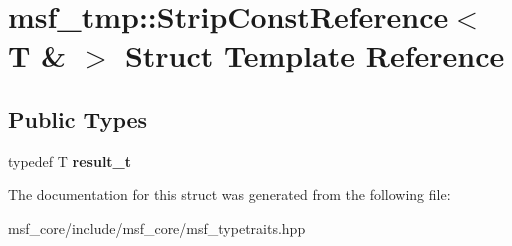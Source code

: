 \hypertarget{structmsf__tmp_1_1StripConstReference_3_01T_01_6_01_4}{\section{msf\-\_\-tmp\-:\-:Strip\-Const\-Reference$<$ T \& $>$ Struct Template Reference}
\label{structmsf__tmp_1_1StripConstReference_3_01T_01_6_01_4}
}
\subsection*{Public Types}
\begin{DoxyCompactItemize}
\item 
\hypertarget{structmsf__tmp_1_1StripConstReference_3_01T_01_6_01_4_ae467d3d062236fe36daa8c856cee2741}{typedef T {\bfseries result\-\_\-t}}\label{structmsf__tmp_1_1StripConstReference_3_01T_01_6_01_4_ae467d3d062236fe36daa8c856cee2741}

\end{DoxyCompactItemize}


The documentation for this struct was generated from the following file\-:\begin{DoxyCompactItemize}
\item 
msf\-\_\-core/include/msf\-\_\-core/msf\-\_\-typetraits.\-hpp\end{DoxyCompactItemize}

